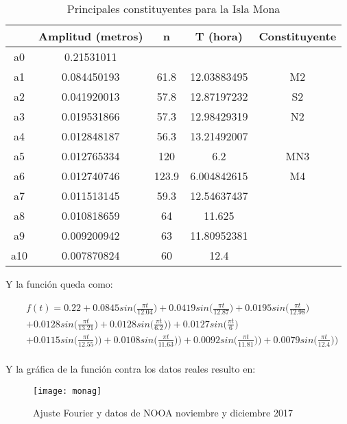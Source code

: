 \documentclass[12pt,letterpaper]{article}
\begin{document}
\begin{table}[H]
\centering
\begin{tabular}{|c|c c c c|}
\hline
	&	Amplitud (metros)	&	n	&	T (hora)	&	Constituyente	\\
    \hline

a0	&	0.21531011	&		&		&		\\
a1	&	0.084450193	&	61.8	&	12.03883495	&	M2	\\
a2	&	0.041920013	&	57.8	&	12.87197232	&	S2	\\
a3	&	0.019531866	&	57.3	&	12.98429319	&	N2	\\
a4	&	0.012848187	&	56.3	&	13.21492007	&		\\
a5	&	0.012765334	&	120	&	6.2	&	MN3	\\
a6	&	0.012740746	&	123.9	&	6.004842615	&	M4	\\
a7	&	0.011513145	&	59.3	&	12.54637437	&		\\
a8	&	0.010818659	&	64	&	11.625	&		\\
a9	&	0.009200942	&	63	&	11.80952381	&		\\
a10	&	0.007870824	&	60	&	12.4	&		\\


\hline
\end{tabular}
\caption{Principales constituyentes para la Isla Mona}
\end{table}

Y la función queda como:

\begin{equation}
 \begin{split}
& f(t) = 0.22 + 0.0845sin\bigg(\frac{\pi t}{12.04}\bigg) + 0.0419sin\bigg(\frac{\pi t}{12.87}\bigg) + 0.0195sin\bigg(\frac{\pi t}{12.98}\bigg)  \\
& + 0.0128sin\bigg(\frac{\pi t}{13.21}\bigg) + 0.0128sin\bigg(\frac{\pi t}{6.2}\bigg)) + 0.0127sin\bigg(\frac{\pi t}{6}\bigg)  \\
& + 0.0115sin\bigg(\frac{\pi t}{12.55}\bigg))
+ 0.0108sin\bigg(\frac{\pi t}{11.63}\bigg)) + 0.0092sin\bigg(\frac{\pi t}{11.81}\bigg)) + 0.0079sin\bigg(\frac{\pi t}{12.4}\bigg)) \\
\end{split}
\end{equation}

Y la gráfica de la función contra los datos reales resulto en:

\begin{figure}[H]
	\centering	\texttt{[image: monag]}
	\caption{Ajuste Fourier y datos de NOOA noviembre y diciembre 2017}
\end{figure}
\end{document}

